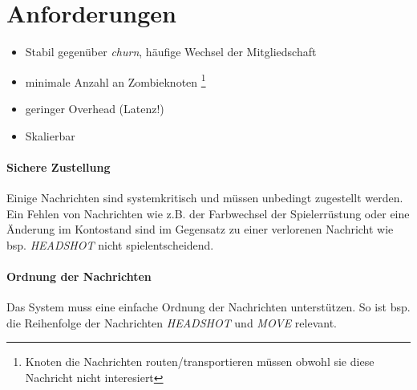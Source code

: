 \section{Anforderungen}
\begin{itemize}
\item Stabil gegenüber \emph{churn}, häufige Wechsel der Mitgliedschaft
\item minimale Anzahl an Zombieknoten \footnote{Knoten die Nachrichten routen/transportieren müssen obwohl sie diese Nachricht nicht interesiert}
\item geringer Overhead (Latenz!)
\item Skalierbar
\end{itemize}




\paragraph{Sichere Zustellung} Einige Nachrichten sind systemkritisch und müssen unbedingt zugestellt werden. Ein Fehlen von Nachrichten wie z.B. der Farbwechsel der Spielerrüstung oder eine Änderung im Kontostand sind im Gegensatz zu einer verlorenen Nachricht wie bsp. \emph{HEADSHOT} nicht spielentscheidend. 

\paragraph{Ordnung der Nachrichten} Das System muss eine einfache Ordnung der Nachrichten unterstützen. So ist bsp. die Reihenfolge der Nachrichten \emph{HEADSHOT} und \emph{MOVE} relevant.


\cite{BeFiMu2006PubSubQoS}

\cite{PiEyKoSh2007-PubSubAPI}

\cite{Katrinis2005}
